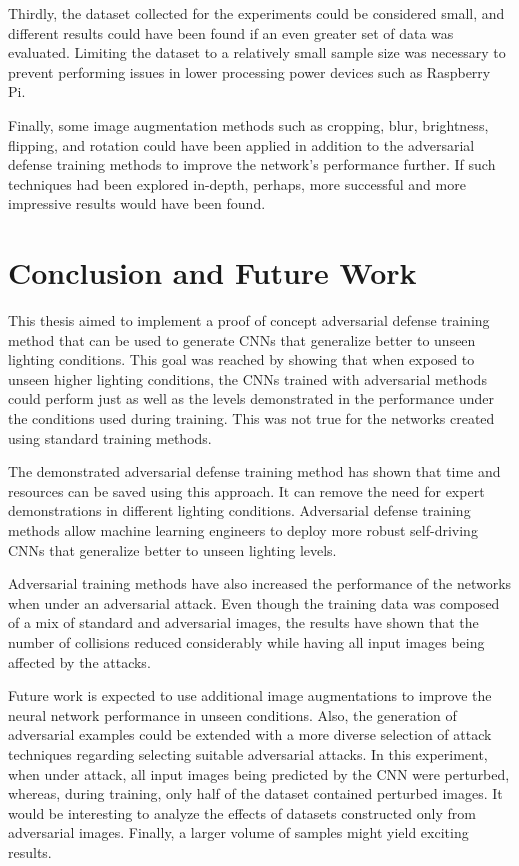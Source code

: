\documentclass[12pt]{article}
\begin{document}
Thirdly, the dataset collected for the experiments could be considered small, and different results could have been found if an even greater set of data was evaluated. Limiting the dataset to a relatively small sample size was necessary to prevent performing issues in lower processing power devices such as Raspberry Pi.

Finally, some image augmentation methods such as cropping, blur, brightness, flipping, and rotation could have been applied in addition to the adversarial defense training methods to improve the network's performance further. If such techniques had been explored in-depth, perhaps, more successful and more impressive results would have been found.

\clearpage

\section{Conclusion and Future Work}

This thesis aimed to implement a proof of concept adversarial defense training method that can be used to generate CNNs that generalize better to unseen lighting conditions. This goal was reached by showing that when exposed to unseen higher lighting conditions, the CNNs trained with adversarial methods could perform just as well as the levels demonstrated in the performance under the conditions used during training. This was not true for the networks created using standard training methods. 

The demonstrated adversarial defense training method has shown that time and resources can be saved using this approach. It can remove the need for expert demonstrations in different lighting conditions. Adversarial defense training methods allow machine learning engineers to deploy more robust self-driving CNNs that generalize better to unseen lighting levels. 

Adversarial training methods have also increased the performance of the networks when under an adversarial attack. Even though the training data was composed of a mix of standard and adversarial images, the results have shown that the number of collisions reduced considerably while having all input images being affected by the attacks. 

Future work is expected to use additional image augmentations to improve the neural network performance in unseen conditions. Also, the generation of adversarial examples could be extended with a more diverse selection of attack techniques regarding selecting suitable adversarial attacks. In this experiment, when under attack, all input images being predicted by the CNN were perturbed, whereas, during training, only half of the dataset contained perturbed images. It would be interesting to analyze the effects of datasets constructed only from adversarial images. Finally, a larger volume of samples might yield exciting results.
\end{document}

